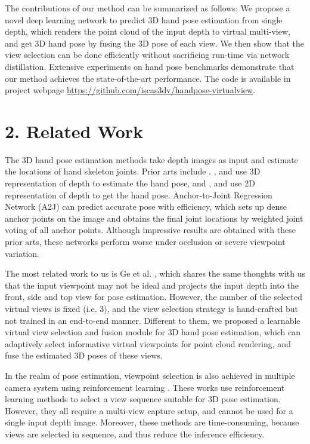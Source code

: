\documentclass[letterpaper]{article} \usepackage{aaai22}  \usepackage{times}  \usepackage{helvet}  \usepackage{courier}  \usepackage[hyphens]{url}  \usepackage{graphicx} \urlstyle{rm} \def\UrlFont{\rm}  \usepackage{natbib}  \usepackage{caption} \DeclareCaptionStyle{ruled}{labelfont=normalfont,labelsep=colon,strut=off} \frenchspacing  \setlength{\pdfpagewidth}{8.5in}  \setlength{\pdfpageheight}{11in}  \usepackage{algorithm}
\begin{document}
The contributions of our method can be summarized as follows: We propose a novel deep learning network to predict 3D hand pose estimation from single depth, which renders the point cloud of the input depth to virtual multi-view, and get 3D hand pose by fusing the 3D pose of each view. 
We then show that the view selection can be done efficiently without sacrificing run-time via network distillation.
Extensive experiments on hand pose benchmarks demonstrate that our method achieves the state-of-the-art performance. 
The code is available in project webpage \textcolor{blue}{\url{https://github.com/iscas3dv/handpose-virtualview}}.

\section{2. Related Work}

The 3D hand pose estimation methods take depth images as input and estimate the locations of hand skeleton joints. Prior arts include \cite{moon2018v2v, ge2018point, rad2018feature, wan2018dense, xiong2019a2j}. \cite{ge2018point}, \cite{deng2020weakly} and \cite{moon2018v2v} use 3D representation of depth to estimate the hand pose, and \cite{wan2018dense}, \cite{rad2018feature} and \cite{xiong2019a2j} use 2D representation of depth to get the hand pose. 
Anchor-to-Joint Regression Network (A2J) \cite{xiong2019a2j} can 
predict accurate pose with efficiency, which sets up dense anchor points on the image and obtains the final joint locations by weighted joint voting of all anchor points. 
Although impressive results are obtained with these prior arts, these networks perform worse under occlusion or severe viewpoint variation.

The most related work to us is Ge et al. \cite{ge2016robust}, which shares the same thoughts with us that the input viewpoint may not be ideal and projects the input depth into the front, side and top view for pose estimation.
However, the number of the selected virtual views is fixed (i.e. 3), and the view selection strategy is hand-crafted but not trained in an end-to-end manner.
Different to them, we proposed a learnable virtual view selection and fusion module for 3D hand pose estimation, which can adaptively select informative virtual viewpoints 
for point cloud rendering, and fuse the estimated 3D poses of these views.

In the realm of pose estimation, viewpoint selection is also achieved in multiple camera system using reinforcement learning \cite{sminchisescu2019domes, gartner2020deep}. These works use reinforcement learning methods to select a view sequence suitable for 3D pose estimation. However, they all require a multi-view capture setup, and cannot be used for a single input depth image. Moreover, these methods are time-consuming, because views are selected in sequence, and thus reduce the inference efficiency.
\end{document}

